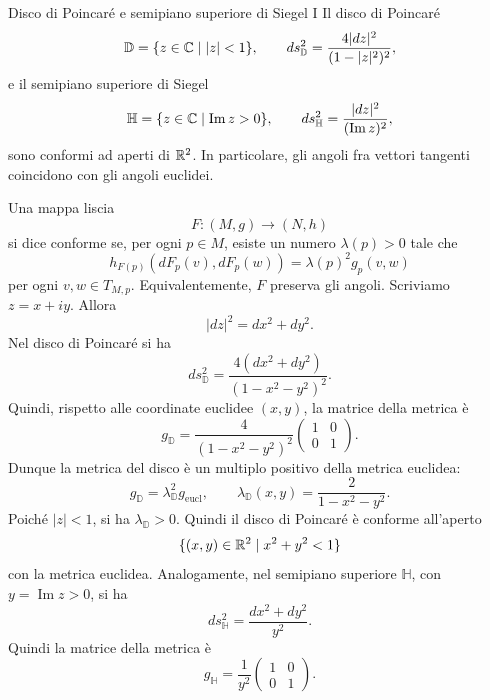 \documentclass[a4paper]{article}
\begin{document}
\begin{snippetproposition}{Disco di Poincaré e semipiano superiore di Siegel I}
    Il disco di Poincaré
    \[
        \mathbb{D} = \{z\in\mathbb{C}\mid |z|<1\},
        \qquad
        ds^2_{\mathbb{D}} = \frac{4|dz|^2}{(1-|z|^2)^2},
    \]
    e il semipiano superiore di Siegel
    \[
        \mathbb{H} = \{z\in\mathbb{C}\mid \operatorname{Im}z>0\},
        \qquad
        ds^2_{\mathbb{H}} = \frac{|dz|^2}{(\operatorname{Im}z)^2},
    \]
    sono conformi ad aperti di \(\mathbb{R}^2\). In particolare, gli angoli fra vettori tangenti
    coincidono con gli angoli euclidei.
\end{snippetproposition}

\begin{snippetproof}{}
    Una mappa liscia
    \[
        F\colon (M,g)\to(N,h)
    \]
    si dice conforme se, per ogni \(p\in M\), esiste un numero \(\lambda(p)>0\) tale che
    \[
        h_{F(p)}(dF_p(v),dF_p(w))=\lambda(p)^2g_p(v,w)
    \]
    per ogni \(v,w\in T_{M,p}\). Equivalentemente, \(F\) preserva gli angoli.
    Scriviamo \(z=x+iy\). Allora
    \[
        |dz|^2=dx^2+dy^2.
    \]
    Nel disco di Poincaré si ha
    \[
        ds^2_{\mathbb{D}}
        =
        \frac{4(dx^2+dy^2)}{(1-x^2-y^2)^2}.
    \]
    Quindi, rispetto alle coordinate euclidee \((x,y)\), la matrice della metrica è
    \[
        g_{\mathbb{D}}
        =
        \frac{4}{(1-x^2-y^2)^2}
        \begin{pmatrix}
            1 & 0\\
            0 & 1
        \end{pmatrix}.
    \]
    Dunque la metrica del disco è un multiplo positivo della metrica euclidea:
    \[
        g_{\mathbb{D}}=\lambda_{\mathbb{D}}^2g_{\mathrm{eucl}},
        \qquad
        \lambda_{\mathbb{D}}(x,y)=\frac{2}{1-x^2-y^2}.
    \]
    Poiché \(|z|<1\), si ha \(\lambda_{\mathbb{D}}>0\). Quindi il disco di Poincaré è conforme all'aperto
    \[
        \{(x,y)\in\mathbb{R}^2\mid x^2+y^2<1\}
    \]
    con la metrica euclidea.
    Analogamente, nel semipiano superiore \(\mathbb{H}\), con \(y=\operatorname{Im}z>0\), si ha
    \[
        ds^2_{\mathbb{H}}
        =
        \frac{dx^2+dy^2}{y^2}.
    \]
    Quindi la matrice della metrica è
    \[
        g_{\mathbb{H}}
        =
        \frac{1}{y^2}
        \begin{pmatrix}
            1 & 0\\
            0 & 1
        \end{pmatrix}.
\]
\end{snippetproof}
\end{document}
